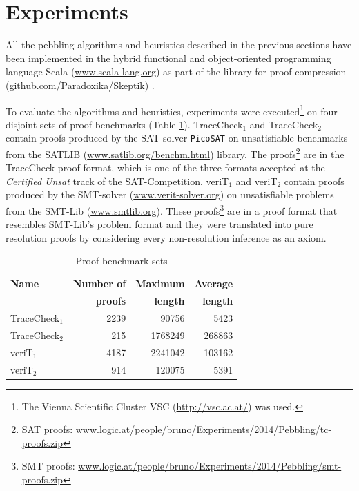 \section{Experiments} 
\label{sec:experiments}

All the pebbling algorithms and heuristics described in the previous sections have been implemented in the hybrid functional and object-oriented programming
language Scala (\url{www.scala-lang.org}) as part of the \skeptik library for proof compression (\url{github.com/Paradoxika/Skeptik}) \cite{Boudou}.

To evaluate the algorithms and heuristics, experiments were executed\footnote{The Vienna Scientific Cluster VSC 
(\url{http://vsc.ac.at/}) was used.} on four disjoint sets of proof benchmarks (Table \ref{tab:benchmarks}). 
TraceCheck$_1$ and TraceCheck$_2$ contain proofs produced by the SAT-solver \texttt{PicoSAT} \cite{Biere2008} on unsatisfiable benchmarks from the SATLIB (\url{www.satlib.org/benchm.html}) library. 
The proofs\footnote{SAT proofs: \url{www.logic.at/people/bruno/Experiments/2014/Pebbling/tc-proofs.zip}} are in the TraceCheck proof format, which is one of the three formats accepted at the \emph{Certified Unsat} track of the SAT-Competition.
veriT$_1$ and veriT$_2$ contain proofs produced by the SMT-solver {\veriT} (\url{www.verit-solver.org}) on unsatisfiable problems from the SMT-Lib (\url{www.smtlib.org}). 
These proofs\footnote{SMT proofs: \url{www.logic.at/people/bruno/Experiments/2014/Pebbling/smt-proofs.zip}} are in a proof format that resembles SMT-Lib's problem format and they were translated into pure resolution proofs by considering every non-resolution inference as an axiom.


\begin{table}[tb]
	\centering
	\setlength{\tabcolsep}{8pt}
	\begin{tabular}{lrrr}
		\toprule
		\textbf{Name} & \textbf{Number of} & \textbf{Maximum} & \textbf{Average} \\ 
		              & \textbf{proofs}    & \textbf{length}  & \textbf{length} \\
		\midrule
		TraceCheck$_1$ & 2239 & 90756   & 5423   \\
		TraceCheck$_2$ & 215	& 1768249 & 268863 \\
    veriT$_1$ & 4187 & 2241042 & 103162 \\
    veriT$_2$ & 914  & 120075  & 5391  \\ 
		\bottomrule   
	\end{tabular}
	\caption{Proof benchmark sets}
	\label{tab:benchmarks}
\end{table}

